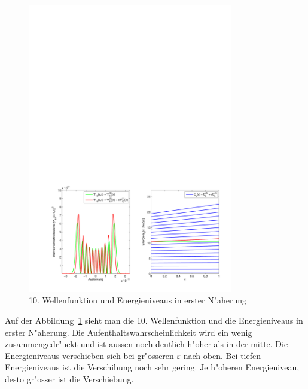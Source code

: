 \begin{refsection}
\begin{figure}[h]	%
\centering
\includegraphics[width=0.8\textwidth]{anharmonisch/images/x4/Stoerung1Wellenfunktion.pdf}
\caption{10. Wellenfunktion und Energieniveaus in erster N"aherung
\label{skript:x4_Stoerung1Wellenfunktion}}
\end{figure}

Auf der Abbildung~\ref{skript:x4_Stoerung1Wellenfunktion} sieht man die 10. Wellenfunktion und die Energieniveaus in erster N"aherung. Die Aufenthaltswahrscheinlichkeit wird ein wenig zusammengedr"uckt und ist aussen noch deutlich h"oher als in der mitte. Die Energieniveaus verschieben sich bei gr"osseren $\varepsilon$ nach oben. Bei tiefen Energieniveaus ist die Verschibung noch sehr gering. Je h"oheren Energieniveau, desto gr"osser ist die Verschiebung.


\end{refsection}
